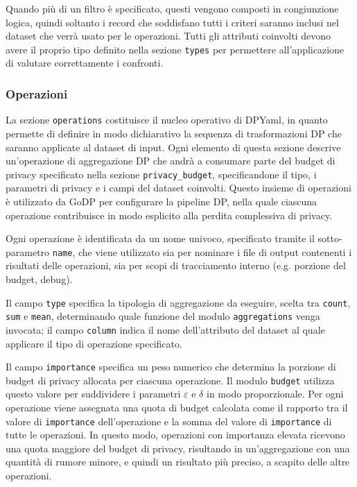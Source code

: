 Quando più di un filtro è specificato, questi vengono composti in congiunzione logica, quindi soltanto i record che soddisfano tutti i criteri saranno inclusi nel dataset che verrà usato per le operazioni. Tutti gli attributi coinvolti devono avere il proprio tipo definito nella sezione \texttt{types} per permettere all'applicazione di valutare correttamente i confronti.

\subsubsection{Operazioni}

La sezione \texttt{operations} costituisce il nucleo operativo di DPYaml, in quanto permette di definire in modo dichiarativo la sequenza di trasformazioni DP che saranno applicate al dataset di input. Ogni elemento di questa sezione descrive un'operazione di aggregazione DP che andrà a consumare parte del budget di privacy specificato nella sezione \texttt{privacy\_budget}, specificandone il tipo, i parametri di privacy e i campi del dataset coinvolti. Questo insieme di operazioni è utilizzato da GoDP per configurare la pipeline DP, nella quale ciascuna operazione contribuisce in modo esplicito alla perdita complessiva di privacy.

Ogni operazione è identificata da un nome univoco, specificato tramite il sotto-parametro \texttt{name}, che viene utilizzato sia per nominare i file di output contenenti i risultati delle operazioni, sia per scopi di tracciamento interno (e.g. porzione del budget, debug).

Il campo \texttt{type} specifica la tipologia di aggregazione da eseguire, scelta tra \texttt{count}, \texttt{sum} e \texttt{mean}, determinando quale funzione del modulo \texttt{aggregations} venga invocata; il campo \texttt{column} indica il nome dell'attributo del dataset al quale applicare il tipo di operazione specificato.

Il campo \texttt{importance} specifica un peso numerico che determina la porzione di budget di privacy allocata per ciascuna operazione. Il modulo \texttt{budget} utilizza questo valore per suddividere i parametri $\varepsilon$ e $\delta$ in modo proporzionale. Per ogni operazione viene assegnata una quota di budget calcolata come il rapporto tra il valore di \texttt{importance} dell'operazione e la somma del valore di \texttt{importance} di tutte le operazioni. In questo modo, operazioni con importanza elevata ricevono una quota maggiore del budget di privacy, risultando in un'aggregazione con una quantità di rumore minore, e quindi un risultato più preciso, a scapito delle altre operazioni.

